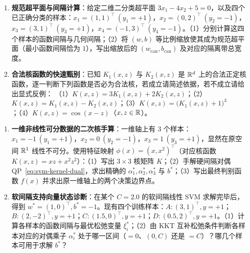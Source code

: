 
\begin{enumerate}[label=\textbf{4.\arabic*}]
  \item \textbf{规范超平面与间隔计算}：给定二维二分类超平面 $3x_1 - 4x_2 + 5 = 0$，以及四个已正确分类的样本：$x_1=(1, 1)^\top\ (y_1=+1)$，$x_2=(0, 2)^\top\ (y_2=-1)$，$x_3=(3, 1)^\top\ (y_3=+1)$，$x_4=(-1, 3)^\top\ (y_4=-1)$。（1）分别计算这四个样本的函数间隔与几何间隔；（2）将 $(w, b)$ 等比例缩放使其成为规范超平面（最小函数间隔恰为 $1$），写出缩放后的 $(w_{\mathrm{can}}, b_{\mathrm{can}})$ 及对应的隔离带总宽度。

  \item \textbf{合法核函数的快速甄别}：已知 $K_1(x, z)$ 与 $K_2(x, z)$ 是 $\mathbb{R}^d$ 上的合法正定核函数，逐一判断下列函数是否必为合法核，若成立请简述依据，若不成立请给出显式反例：
  （1）$K(x, z) = 3 K_1(x, z) + 2 K_2(x, z)$；（2）$K(x, z) = K_1(x, z) - K_2(x, z)$；（3）$K(x, z) = \big(K_1(x, z) + 1\big)^3$；（4）$K(x, z) = \cos(x - z)$（$x, z \in \mathbb{R}$）。
\end{enumerate}


\begin{enumerate}[label=\textbf{4.\arabic*}, resume]
  \item \textbf{一维非线性可分数据的二次核手算}：一维轴上有 3 个样本：$x_1 = -1\ (y_1 = +1)$，$x_2 = 0\ (y_2 = -1)$，$x_3 = 1\ (y_3 = +1)$，显然在原空间 $\mathbb{R}^1$ 线性不可分。使用特征映射 $\phi(x) = (x, x^2)^\top$（对应核函数 $K(x, z) = xz + x^2 z^2$）：（1）写出 $3\times 3$ 核矩阵 $K$；（2）手解硬间隔对偶 QP~\eqref{eq:svm-kernel-dual}，求出精确的 $\alpha_1^*, \alpha_2^*, \alpha_3^*$ 与 $b^*$；（3）写出最终判别函数 $f(x)$ 并求出原一维轴上的两个决策边界点。

  \item \textbf{软间隔支持向量状态诊断}：在某个 $C = 2.0$ 的软间隔线性 SVM 求解完毕后，得到 $w^* = (1, 0)^\top, b^* = -1$。现有四个训练样本：$A:(3, 1)^\top, y=+1$；$B:(2, -2)^\top, y=+1$；$C:(1.5, 0)^\top, y=+1$；$D:(0.5, 2)^\top, y=+1$。（1）计算各样本的函数间隔与最优松弛变量 $\xi_i^*$；（2）由 KKT 互补松弛条件判断各样本对应的对偶乘子 $\alpha_i^*$ 处于哪一区间（$=0$、$(0, C)$ 还是 $=C$）？哪几个样本可用于求解 $b^*$？
\end{enumerate}

